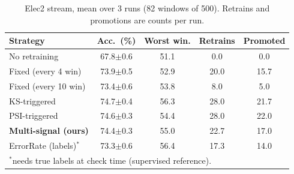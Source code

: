 \begin{table}[t]
\caption{Elec2 stream, mean over 3 runs (82 windows of 500). Retrains and promotions are counts per run.}
\label{tab:elec2}
\centering\footnotesize\setlength{\tabcolsep}{3pt}
\begin{tabular}{lcccc}
\toprule
Strategy & Acc.\ (\%) & Worst win. & Retrains & Promoted \\
\midrule
No retraining & 67.8$\pm$0.6 & 51.1 & 0.0 & 0.0 \\
Fixed (every 4 win) & 73.9$\pm$0.5 & 52.9 & 20.0 & 15.7 \\
Fixed (every 10 win) & 73.4$\pm$0.6 & 53.8 & 8.0 & 5.0 \\
KS-triggered & 74.7$\pm$0.4 & 56.3 & 28.0 & 21.7 \\
PSI-triggered & 74.6$\pm$0.3 & 54.4 & 28.0 & 22.0 \\
\textbf{Multi-signal (ours)} & 74.4$\pm$0.3 & 55.0 & 22.7 & 17.0 \\
ErrorRate (labels)$^*$ & 73.3$\pm$0.6 & 56.4 & 17.3 & 14.0 \\
\bottomrule
\multicolumn{5}{l}{\scriptsize $^*$needs true labels at check time (supervised reference).}
\end{tabular}
\end{table}
